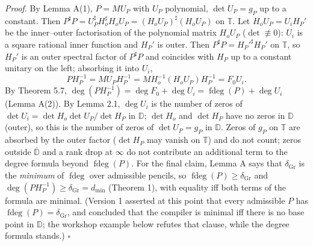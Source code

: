 \documentclass[
  11pt,
  a4paper,
]{article}
\begin{document}
\emph{Proof.} By Lemma A(1), \(P=MU_P\) with \(U_P\) polynomial,
\(\det U_P=g_P\) up to a constant. Then
\(P^\sharp P=U_P^\sharp H_o^\sharp H_oU_P=(H_oU_P)^\sharp(H_oU_P)\) on
\(\mathbb T\). Let \(H_oU_P=U_iH_P'\) be the inner--outer factorisation
of the polynomial matrix \(H_oU_P\) (\(\det\not\equiv0\)): \(U_i\) is a
square rational inner function and \(H_P'\) is outer. Then
\(P^\sharp P=H_P'^\sharp H_P'\) on \(\mathbb T\), so \(H_P'\) is an
outer spectral factor of \(P^\sharp P\) and coincides with \(H_P\) up to
a constant unitary on the left; absorbing it into \(U_i\),
\[PH_P^{-1}=MU_PH_P^{-1}=MH_o^{-1}(H_oU_P)H_P^{-1}=F_0U_i .\] By Theorem
5.7,
\(\deg(PH_P^{-1})=\deg F_0+\deg U_i=\operatorname{fdeg}(P)+\deg U_i\)
(Lemma A(2)). By Lemma 2.1, \(\deg U_i\) is the number of zeros of
\(\det U_i=\det H_o\det U_P/\det H_P\) in \(\mathbb D\); \(\det H_o\)
and \(\det H_P\) have no zeros in \(\mathbb D\) (outer), so this is the
number of zeros of \(\det U_P=g_P\) in \(\mathbb D\). Zeros of \(g_P\)
on \(\mathbb T\) are absorbed by the outer factor (\(\det H_P\) may
vanish on \(\mathbb T\)) and do not count; zeros outside
\(\overline{\mathbb D}\) and a rank drop at \(\infty\) do not contribute
an additional term to the degree formula beyond
\(\operatorname{fdeg}(P)\). For the final claim, Lemma A says that
\(\delta_{\mathrm{Gr}}\) is the \emph{minimum} of
\(\operatorname{fdeg}\) over admissible pencils, so
\(\operatorname{fdeg}(P)\ge\delta_{\mathrm{Gr}}\) and
\(\deg(PH_P^{-1})\ge\delta_{\mathrm{Gr}}=d_{\min}\) (Theorem 1), with
equality iff both terms of the formula are minimal. (Version 1 asserted
at this point that every admissible \(P\) has
\(\operatorname{fdeg}(P)=\delta_{\mathrm{Gr}}\), and concluded that the
compiler is minimal iff there is no base point in \(\mathbb D\); the
workshop example below refutes that clause, while the degree formula
stands.) \(\square\)
\end{document}
